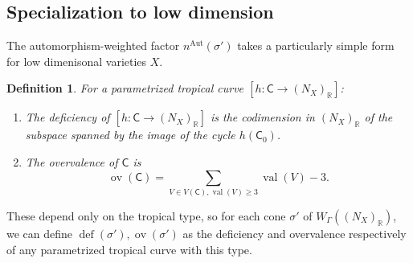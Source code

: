 \documentclass{article}
\def\R{\mathbb{R}}
\newtheorem{definition}{Definition}[section]
\newcommand{\tropC}{\mathsf{C}}
\newcommand{\defic}[1]{\operatorname{def}(#1)}
\newcommand{\ov}[1]{\operatorname{ov}(#1)}
\newcommand{\val}[1]{\operatorname{val}(#1)}
\newcommand{\nn}{n^{\operatorname{Aut}}}
\begin{document}
\subsection{Specialization to low dimension}

The automorphism-weighted factor $\nn(\sigma')$ takes a particularly simple form for low dimenisonal varieties $X$.




\begin{definition} \label{def:deficandov}
    For a parametrized tropical curve $[h: \tropC \rightarrow (N_X)_{\mathbb{R}}]$:
    \begin{enumerate}
        \item The deficiency of $[h: \tropC \rightarrow (N_X)_\R]$ is the codimension in $(N_X)_\R$ of the subspace spanned by the image of the cycle $h(\tropC_0)$.
        \item The overvalence of $\tropC$ is 
        $$ \ov{\tropC} = \sum_{V \in V(\tropC), \val{V} \geq 3} \val{V} - 3.$$
    \end{enumerate}
     
\end{definition}


These depend only on the tropical type, so for each cone $\sigma'$ of $W_{\Gamma}((N_X)_{\mathbb{R}})$, we can define $\defic{\sigma'}, \ov{\sigma'}$ as the deficiency and overvalence respectively of any parametrized tropical curve with this type. 
\end{document}
